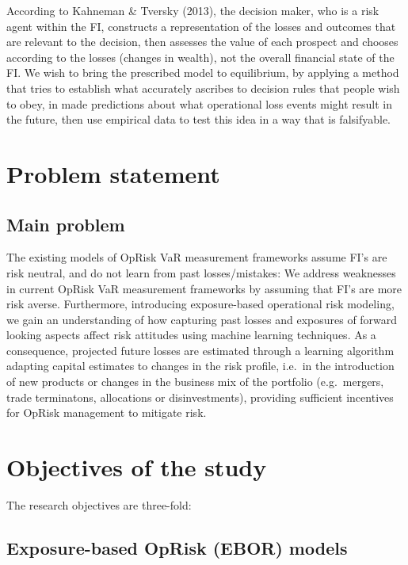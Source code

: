 \documentclass{DissertateUSU}
\begin{document}
According to Kahneman \& Tversky (2013), the decision maker, who is a
risk agent within the FI, constructs a representation of the losses and
outcomes that are relevant to the decision, then assesses the value of
each prospect and chooses according to the losses (changes in wealth),
not the overall financial state of the FI. We wish to bring the
prescribed model to equilibrium, by applying a method that tries to
establish what accurately ascribes to decision rules that people wish to
obey, in made predictions about what operational loss events might
result in the future, then use empirical data to test this idea in a way
that is falsifyable.

\section{Problem statement}
\label{sec:Problem statement}

\subsection{Main problem}

The existing models of OpRisk VaR measurement frameworks assume FI's are
risk neutral, and do not learn from past losses/mistakes: We address
weaknesses in current OpRisk VaR measurement frameworks by assuming that
FI's are more risk averse. Furthermore, introducing exposure-based
operational risk modeling, we gain an understanding of how capturing
past losses and exposures of forward looking aspects affect risk
attitudes using machine learning techniques. As a consequence, projected
future losses are estimated through a learning algorithm adapting
capital estimates to changes in the risk profile, i.e.~in the
introduction of new products or changes in the business mix of the
portfolio (e.g.~mergers, trade terminatons, allocations or
disinvestments), providing sufficient incentives for OpRisk management
to mitigate risk.

\section{Objectives of the study}
\label{sec:Objectives of the study}

The research objectives are three-fold:

\subsection{Exposure-based OpRisk (EBOR) models}
\end{document}
